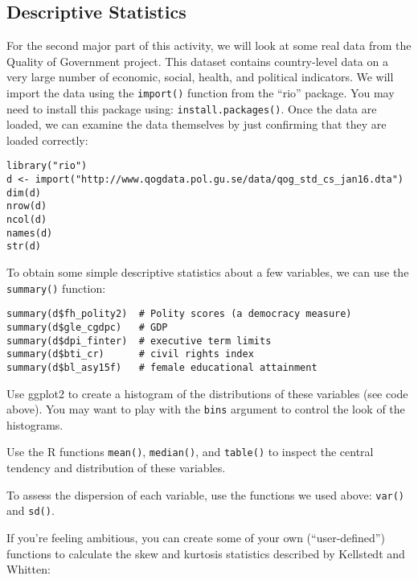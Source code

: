 \documentclass[a4paper,12pt]{article}
\begin{document}
\subsection{Descriptive Statistics}

\begin{enumerate*}
\item For the second major part of this activity, we will look at some real data from the Quality of Government project. This dataset contains country-level data on a very large number of economic, social, health, and political indicators. We will import the data using the \texttt{import()} function from the ``rio'' package. You may need to install this package using: \texttt{install.packages()}. Once the data are loaded, we can examine the data themselves by just confirming that they are loaded correctly:

\begin{verbatim}
library("rio")
d <- import("http://www.qogdata.pol.gu.se/data/qog_std_cs_jan16.dta")
dim(d)
nrow(d)
ncol(d)
names(d)
str(d)
\end{verbatim}

\item To obtain some simple descriptive statistics about a few variables, we can use the \texttt{summary()} function:

\begin{verbatim}
summary(d$fh_polity2)  # Polity scores (a democracy measure)
summary(d$gle_cgdpc)   # GDP
summary(d$dpi_finter)  # executive term limits
summary(d$bti_cr)      # civil rights index
summary(d$bl_asy15f)   # female educational attainment
\end{verbatim}

\item Use ggplot2 to create a histogram of the distributions of these variables (see code above). You may want to play with the \texttt{bins} argument to control the look of the histograms.

\item Use the R functions \texttt{mean()}, \texttt{median()}, and \texttt{table()} to inspect the central tendency and distribution of these variables.

\item To assess the dispersion of each variable, use the functions we used above: \texttt{var()} and \texttt{sd()}.

\item If you're feeling ambitious, you can create some of your own (``user-defined'') functions to calculate the skew and kurtosis statistics described by Kellstedt and Whitten:


\end{enumerate*}
\end{document}
